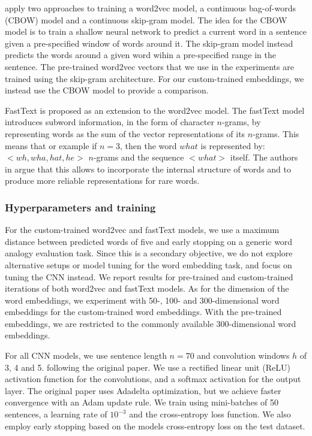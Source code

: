 \documentclass[conference]{IEEEtran}
\begin{document}
 \cite{mikolov2013efficient} apply two approaches to training a word2vec model, a continuous bag-of-words (CBOW) model and a continuous skip-gram model. The idea for the CBOW model  is to train a shallow neural network to predict a current word in a sentence given a pre-specified window of words around it. The skip-gram model instead predicts the words around a given word wihin a pre-specified range in the sentence. The pre-trained word2vec vectors that we use in the experiments are trained using the skip-gram architecture. For our custom-trained embeddings, we instead use the CBOW model to provide a comparison.

FastText \cite{bojanowski2016enriching} is proposed as an extension to the word2vec model. The fastText model introduces subword information, in the form of character $n$-grams, by representing words as the sum of the vector representations of its $n$-grams. This means that or example if $n = 3$, then the word $what$ is represented by: $<wh, wha, hat, he>$ $n$-grams and the sequence $<what>$ itself. The authors in \cite{bojanowski2016enriching} argue that this allows to incorporate the internal structure of words and to produce more reliable representations for rare words.


\subsubsection{Hyperparameters and training}
 For the custom-trained word2vec and fastText models, we use a maximum distance between predicted words of five and early stopping on a generic word analogy evaluation task. Since this is a secondary objective, we do not explore alternative setups or model tuning for the word embedding task, and focus on tuning the CNN instead. We report results for pre-trained and custom-trained iterations of both word2vec and fastText models. As for the dimension of the word embeddings, we experiment with 50-, 100- and 300-dimensional word embeddings for the custom-trained word embeddings. With the pre-trained embeddings, we are restricted to the commonly available 300-dimensional word embeddings. 

For all CNN models, we use sentence length $n = 70$ and convolution windows $h$ of 3, 4 and 5.  following the original paper. We use a rectified linear unit (ReLU) activation function for the convolutions, and a softmax activation for the output layer. The original paper uses Adadelta \cite{adadelta} optimization, but we achieve faster convergence with an Adam \cite{adam} update rule. We train using mini-batches of 50 sentences, a learning rate of $10^{-3}$ and the cross-entropy loss function. We also employ early stopping based on the models cross-entropy loss on the test dataset.
\end{document}
